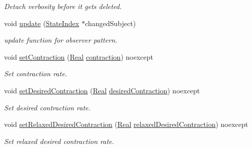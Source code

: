 \begin{DoxyCompactItemize}
\begin{DoxyCompactList}\small\item\em Detach verbosity before it gets deleted. \end{DoxyCompactList}\item 
\hypertarget{classSpacy_1_1Mixin_1_1StateIndex_a632299c8de748ea73d1fcbbb4d8f734a}{}void \hyperlink{classSpacy_1_1Mixin_1_1StateIndex_a632299c8de748ea73d1fcbbb4d8f734a}{update} (\hyperlink{classSpacy_1_1Mixin_1_1StateIndex_a0dfcecf87c0982d6c4d8859661aad1fa_a0dfcecf87c0982d6c4d8859661aad1fa}{State\+Index} $\ast$changed\+Subject)\label{classSpacy_1_1Mixin_1_1StateIndex_a632299c8de748ea73d1fcbbb4d8f734a}

\begin{DoxyCompactList}\small\item\em update function for observer pattern. \end{DoxyCompactList}\item 
void \hyperlink{classSpacy_1_1Mixin_1_1ContractionRate_ab9215981f0454bd5d641abad582e64e5_ab9215981f0454bd5d641abad582e64e5}{set\+Contraction} (\hyperlink{classSpacy_1_1Real}{Real} \hyperlink{classSpacy_1_1Mixin_1_1ContractionRate_a6c5e653393be91e468364733702e5334_a6c5e653393be91e468364733702e5334}{contraction}) noexcept
\begin{DoxyCompactList}\small\item\em Set contraction rate. \end{DoxyCompactList}\item 
void \hyperlink{classSpacy_1_1Mixin_1_1ContractionRate_a26eaa6344b5b2191931a9fd87ed96f39_a26eaa6344b5b2191931a9fd87ed96f39}{set\+Desired\+Contraction} (\hyperlink{classSpacy_1_1Real}{Real} \hyperlink{classSpacy_1_1Mixin_1_1ContractionRate_aaefb97e44b51fb6c8017eb2b40659d64_aaefb97e44b51fb6c8017eb2b40659d64}{desired\+Contraction}) noexcept
\begin{DoxyCompactList}\small\item\em Set desired contraction rate. \end{DoxyCompactList}\item 
void \hyperlink{classSpacy_1_1Mixin_1_1ContractionRate_ac6e47c0ab683643fea7490703f02632d_ac6e47c0ab683643fea7490703f02632d}{set\+Relaxed\+Desired\+Contraction} (\hyperlink{classSpacy_1_1Real}{Real} \hyperlink{classSpacy_1_1Mixin_1_1ContractionRate_a569e3e3766394ccc46a13bd6ca122394_a569e3e3766394ccc46a13bd6ca122394}{relaxed\+Desired\+Contraction}) noexcept
\begin{DoxyCompactList}\small\item\em Set relaxed desired contraction rate. \end{DoxyCompactList}\item 

\end{DoxyCompactItemize}
